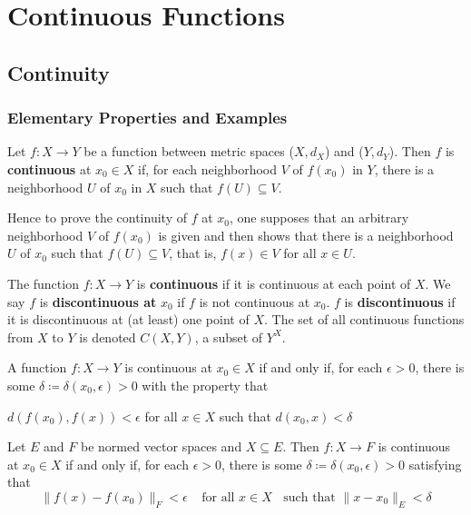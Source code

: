 \part{Continuous Functions}

\chapter{Continuity}

\section{Elementary Properties and Examples}

Let \(f \colon X \to Y \) be a function between metric spaces (\(X, d_X\)) and 
(\(Y, d_Y\)). Then \(f\) is \textbf{continuous} at \(x_0 \in X\) if, for each 
neighborhood \(V\) of \(f\left(x_0\right)\) in \(Y\), there is a neighborhood
\(U\) of \(x_0\) in \(X\) such that \(f\left(U\right) \subseteq V\). 


Hence to prove the continuity of \(f\) at \(x_0\), one supposes that an arbitrary 
neighborhood \(V\) of \(f\left(x_0\right)\) is given and then shows that there is 
a neighborhood \(U\) of \(x_0\) such that \(f\left(U\right) \subseteq V\), that is,
\(f\left(x\right) \in V\) for all \(x \in U\). 


The function \(f \colon X \to Y\) is \textbf{continuous} if it is continuous at each point
of \(X\). We say \(f\) is \textbf{discontinuous at} \(x_0\) if \(f\) is not continuous
at \(x_0\). \(f\) is \textbf{discontinuous} if it is discontinuous at (at least) one point
of \(X\). The set of all continuous functions from \(X\) to \(Y\) is denoted 
\(C \left(X, Y\right)\), a subset of \(Y^X\). 

\begin{proposition}
    A function \(f \colon X \to Y\) is continuous at \(x_0 \in X\) if and only if, for
    each \(\epsilon > 0\), there is some \(\delta \coloneqq \delta\left(x_0, \epsilon\right) > 0\)
    with the property that 
    \begin{center}
        \(d\left(f\left(x_0\right), f\left(x\right)\right) < \epsilon\) for all 
        \(x\in X\) such that \(d\left(x_0, x\right) < \delta\)
    \end{center}
\end{proposition}

\begin{corollary}
    Let \(E\) and \(F\) be normed vector spaces and \(X \subseteq E\). Then \(f \colon X \to F\)
    is continuous at \(x_0 \in X\) if and only if, for each \(\epsilon > 0\), there is 
    some \(\delta \coloneqq \delta\left(x_0, \epsilon\right) > 0\) satisfying that 
    \[
        \lVert f(x) - f(x_0) \rVert_F < \epsilon \:\:\:\:\: \text{for all } x \in X 
        \:\:\:\: \text{such that } \lVert x - x_0 \rVert_E < \delta 
    \]
\end{corollary}

